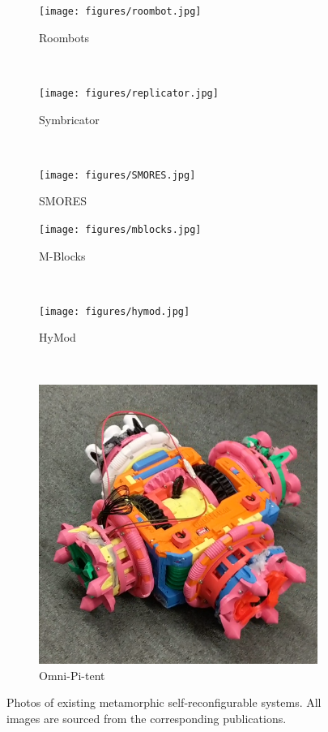 \begin{figure}[!p]
    \begin{subfigure}[b]{0.315\textwidth}
        \centering
        \texttt{[image: figures/roombot.jpg]}
        \caption{Roombots}
    \end{subfigure}
    ~
    \begin{subfigure}[b]{0.315\textwidth}
        \centering
        \texttt{[image: figures/replicator.jpg]}
        \caption{Symbricator}
    \end{subfigure}
    ~
    \begin{subfigure}[b]{0.315\textwidth}
        \centering
        \texttt{[image: figures/SMORES.jpg]}
        \caption{SMORES}
    \end{subfigure}

    \begin{subfigure}[b]{0.315\textwidth}
        \centering
        \texttt{[image: figures/mblocks.jpg]}
        \caption{M-Blocks}
    \end{subfigure}
    ~
    \begin{subfigure}[b]{0.315\textwidth}
        \centering
        \texttt{[image: figures/hymod.jpg]}
        \caption{HyMod}
    \end{subfigure}
    ~
    \begin{subfigure}[b]{0.315\textwidth}
        \centering
        \includegraphics[width=\textwidth,height=\textwidth,keepaspectratio]{figures/omnipitent.png}
        \caption{Omni-Pi-tent}
    \end{subfigure}


    \caption{Photos of existing metamorphic self-reconfigurable systems. All
    images are sourced from the corresponding publications.}
    \label{fig:robots}
\end{figure}



